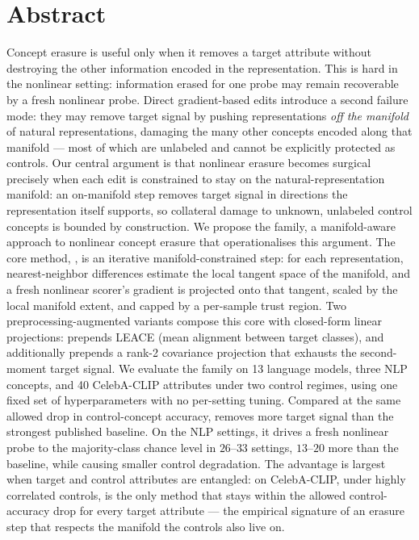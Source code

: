 \section*{Abstract}

Concept erasure is useful only when it removes a target attribute without destroying the other information encoded in the representation. This is hard in the nonlinear setting: information erased for one probe may remain recoverable by a fresh nonlinear probe. Direct gradient-based edits introduce a second failure mode: they may remove target signal by pushing representations \emph{off the manifold} of natural representations, damaging the many other concepts encoded along that manifold --- most of which are unlabeled and cannot be explicitly protected as controls. Our central argument is that nonlinear erasure becomes surgical precisely when each edit is constrained to stay on the natural-representation manifold: an on-manifold step removes target signal in directions the representation itself supports, so collateral damage to unknown, unlabeled control concepts is bounded by construction. We propose the \TanGCE{} family, a manifold-aware approach to nonlinear concept erasure that operationalises this argument. The core method, \TanGCE{}, is an iterative manifold-constrained step: for each representation, nearest-neighbor differences estimate the local tangent space of the manifold, and a fresh nonlinear scorer's gradient is projected onto that tangent, scaled by the local manifold extent, and capped by a per-sample trust region. Two preprocessing-augmented variants compose this core with closed-form linear projections: \TanGCEp{} prepends LEACE (mean alignment between target classes), and \TanGCEpp{} additionally prepends a rank-2 covariance projection that exhausts the second-moment target signal. We evaluate the family on 13 language models, three NLP concepts, and 40 CelebA-CLIP attributes under two control regimes, using one fixed set of hyperparameters with no per-setting tuning. Compared at the same allowed drop in control-concept accuracy, \TanGCEpp{} removes more target signal than the strongest published baseline. On the NLP settings, it drives a fresh nonlinear probe to the majority-class chance level in $26$--$33$ settings, $13$--$20$ more than the baseline, while causing smaller control degradation. The advantage is largest when target and control attributes are entangled: on CelebA-CLIP, under highly correlated controls, \TanGCEpp{} is the only method that stays within the allowed control-accuracy drop for every target attribute --- the empirical signature of an erasure step that respects the manifold the controls also live on.
